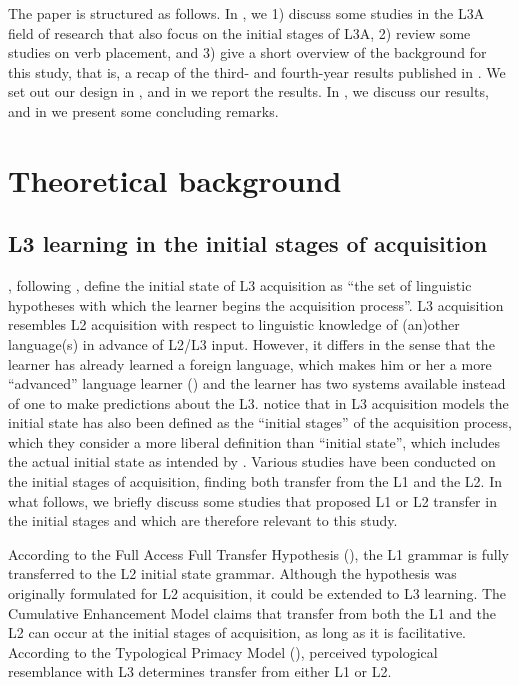 \documentclass[output=paper]{langsci/langscibook}
\begin{document}
The paper is structured as follows. In , we 1) discuss some studies in the L3A field of research that also focus on the initial stages of L3A, 2) review some studies on verb placement, and 3) give a short overview of the background for this study, that is, a recap of the third- and fourth-year results published in \citet{StadtEtAl2016, StadtEtAl2018Exposure}. We set out our design in , and in  we report the results. In , we discuss our results, and in  we present some concluding remarks.

\section{Theoretical background}%
\label{sec:stadt:2}
\subsection{ L3 learning in the initial stages of acquisition}%
\label{sec:stadt:2.1}

 \citet[15]{GarciaMayoRothman2012}, following \citet{SchwartzSprouse1996}, define the initial state of L3 acquisition as “the set of linguistic hypotheses with which the learner begins the acquisition process”. L3 acquisition resembles L2 acquisition with respect to linguistic knowledge of (an)other language(s) in advance of L2/L3 input. However, it differs in the sense that the learner has already learned a foreign language, which makes him or her a more ``advanced'' language learner (\citealt{CenozValencia1994, Jessner2006}) and the learner has two systems available instead of one to make predictions about the L3. \citet[fn. 12]{GarciaMayoRothman2012} notice that in L3 acquisition models the initial state has also been defined as the ``initial stages'' of the acquisition process, which they consider a more liberal definition than ``initial state'', which includes the actual initial state as intended by \citet{SchwartzSprouse1996}. Various studies have been conducted on the initial stages of acquisition, finding both transfer from the L1 and the L2. In what follows, we briefly discuss some studies that proposed L1 or L2 transfer in the initial stages and which are therefore relevant to this study.

According to the Full Access Full Transfer Hypothesis (\citealt{SchwartzSprouse1996}), the L1 grammar is fully transferred to the L2 initial state grammar. Although the hypothesis was originally formulated for L2 acquisition, it could be extended to L3 learning. The Cumulative Enhancement Model \citep{FlynnEtAl2004} claims that transfer from both the L1 and the L2 can occur at the initial stages of acquisition, as long as it is facilitative. According to the Typological Primacy Model (\citealt{Rothman2010, Rothman2011, Rothman2015}), perceived typological resemblance with L3 determines transfer from either L1 or L2.
\end{document}
